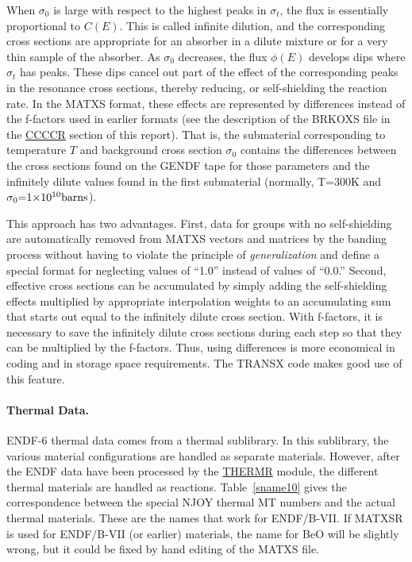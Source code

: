 When $\sigma_0$ is large with respect to the highest peaks in
$\sigma_t$, the flux is essentially proportional to $C(E)$.  This is
called infinite dilution, and the corresponding cross sections are
appropriate for an absorber in a dilute mixture or for a very thin
sample of the absorber.  As $\sigma_0$ decreases, the flux $\phi(E)$
develops dips where $\sigma_t$ has peaks.  These dips cancel out part
of the effect of the corresponding peaks in the resonance cross
sections, thereby reducing, or self-shielding the reaction rate.
In the MATXS format, these effects are represented by  differences
instead of the  f-factors used in earlier formats (see the description
of the BRKOXS file in the \hyperlink{sCCCCRhy}{CCCCR}
section of this report).  That is,
the submaterial corresponding to temperature $T$ and background cross
section $\sigma_0$ contains the differences between the cross sections
found on the GENDF tape for those parameters and the infinitely dilute
values found in the first submaterial (normally, T=300K and
$\sigma_0{=}1{\times}10^{10} {\rm barns}$).

This approach has two advantages.  First, data for groups with no
self-shielding are automatically removed from MATXS vectors and matrices
by the banding process without having to violate the principle
of {\it generalization} and define a special format for neglecting
values of ``1.0'' instead of values of ``0.0.'' Second, effective
cross sections can be accumulated by simply adding the self-shielding
effects multiplied by appropriate interpolation weights to an
accumulating sum that starts out equal to the infinitely dilute
cross section.  With f-factors, it is necessary to save the infinitely
dilute cross sections during each step so that they can be multiplied
by the f-factors.  Thus, using differences is more economical in coding
and in storage space requirements.  The TRANSX code makes good use of
this feature.

\paragraph{Thermal Data.}
ENDF-6 thermal data comes from a thermal sublibrary.  In this sublibrary,
the various material configurations are handled as separate materials.
However, after the ENDF data have been processed by the
\hyperlink{sTHERMRhy}{THERMR} module,
the different thermal materials are handled as reactions.
Table~\ref{sname10} gives the correspondence between the special
NJOY thermal MT numbers and the actual thermal materials.  These are
the names that work for ENDF/B-VII\cite{ENDF7}.  If MATXSR is
used for ENDF/B-VII (or earlier) materials, the name for BeO will
be slightly wrong, but it could be fixed by hand editing of the
MATXS file.

